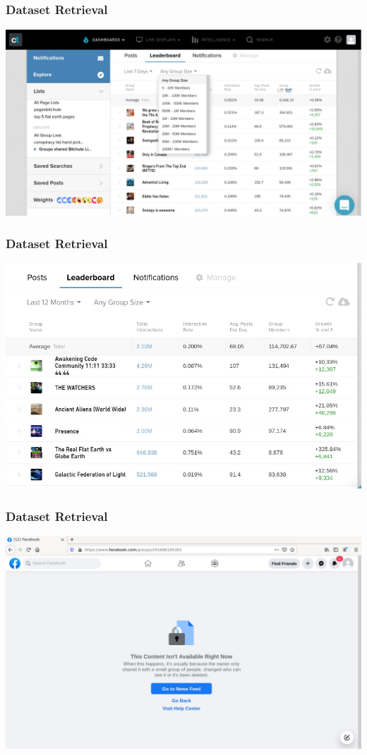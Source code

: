 \documentclass[notes]{tum-presentation}
\begin{document}
\begin{frame}
  \frametitle{Dataset Retrieval}

  \begin{center}
    \includegraphics[width=.7\textwidth]{pictures/crowdtangle_leaderboard.png}
  \end{center}
  \note{  

  }
\end{frame}
\begin{frame}
  \frametitle{Dataset Retrieval}

  \begin{center}
    \includegraphics[width=.6\textwidth]{pictures/crowdtangle_handpicked.png}
  \end{center}
  \note{  

  }
\end{frame}
\begin{frame}
  \frametitle{Dataset Retrieval}

  \begin{center}
    \includegraphics[width=.7\textwidth]{pictures/crowdtangle_deleted.png}
  \end{center}
  \note{  

  }
\end{frame}
\end{document}
